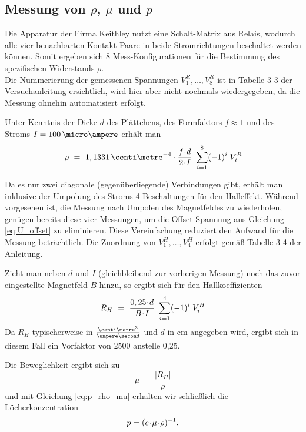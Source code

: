 \newpage
\subsection{Messung von $\rho$, $\mu$ und $p$}

Die Apparatur der Firma Keithley nutzt eine Schalt-Matrix aus Relais, wodurch alle vier benachbarten Kontakt-Paare in beide Stromrichtungen beschaltet werden können. Somit ergeben sich 8 Mess-Konfigurationen für die Bestimmung des spezifischen Widerstands $\rho$.\\
Die Nummerierung der gemessenen Spannungen $V^R_1, \dots, V^R_8$ ist in Tabelle 3-3 der Versuchanleitung ersichtlich, wird hier aber nicht nochmals wiedergegeben, da die Messung ohnehin automatisiert erfolgt.

Unter Kenntnis der Dicke $d$ des Plättchens, des Formfaktors $f \approx 1$ und des Stroms  $I = 100\,\micro\ampere$ erhält man
\begin{equation}
\rho ~=~ 1,1331 \,\centi\metre^{-4} \cdot \frac{f \cdt d}{2 \cdt I} ~ \sum\limits_{i=1}^8 (-1)^i \; V^R_i
\end{equation}

Da es nur zwei \glqq diagonale\grqq{} (gegenüberliegende) Verbindungen gibt, erhält man inklusive der Umpolung des Stroms 4 Beschaltungen für den Halleffekt. Während vorgesehen ist, die Messung nach Umpolen des Magnetfeldes zu wiederholen, genügen bereits diese vier Messungen, um die Offset-Spannung aus Gleichung \eqref{eq:U_offset} zu eliminieren. Diese Vereinfachung reduziert den Aufwand für die Messung beträchtlich. Die Zuordnung von $V^H_1, \dots, V^H_4$ erfolgt gemäß Tabelle 3-4 der Anleitung.

Zieht man neben $d$ und $I$ (gleichbleibend zur vorherigen Messung) noch das zuvor eingestellte Magnetfeld $B$ hinzu, so ergibt sich für den Hallkoeffizienten 
\begin{equation}
R_H ~=~ \frac{0,25 \!\cdot\! d}{B \!\cdot\! I} ~ \sum\limits_{i=1}^4 (-1)^i \; V^H_i
\end{equation}
Da $R_H$ typischerweise in $\tfrac{\centi\metre^3}{\ampere\second}$ und $d$ in cm angegeben wird, ergibt sich in diesem Fall ein Vorfaktor von 2500 anstelle 0,25.

Die Beweglichkeit ergibt sich zu
\begin{equation}
\mu ~=~ \frac{|R_H|}{\rho}
\end{equation}
und mit Gleichung \eqref{eq:p_rho_mu} erhalten wir schließlich die Löcherkonzentration
\begin{equation}
p = (e \!\cdot\! \mu \!\cdot\! \rho)^{-1}.
\end{equation}


